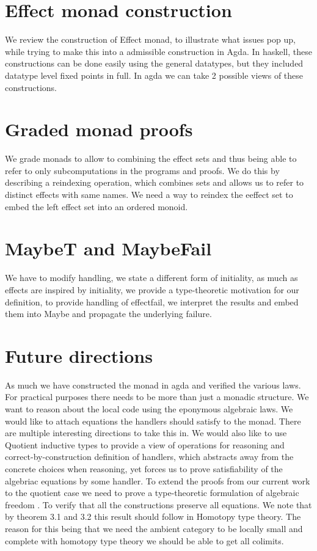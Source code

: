 \documentclass{article}
\begin{document}
\section{Effect monad construction}

We review the construction of Effect monad, to illustrate what issues pop up, while trying to make this into a admissible construction in Agda.
In haskell, these constructions can be done easily using the general datatypes, but they included datatype level fixed points in full.
In agda we can take 2 possible views of these constructions.

\section{Graded monad proofs}

We grade monads to allow to combining the effect sets and thus being able to refer to only subcomputations in the programs and proofs.
We do this by describing a reindexing operation, which combines sets and allows us to refer to distinct effects with same names.
We need a way to reindex the eeffect set to embed the left effect set into an ordered monoid.

\section{MaybeT and MaybeFail}
We have to modify handling, we state a different form of initiality, as much as effects are inspired by initiality, we provide a type-theoretic
motivation
for our definition, to provide handling of effectfail, we interpret the results and embed them into Maybe and propagate the underlying failure.
\section{Future directions}
As much we have constructed the monad in agda and verified the various laws. For practical purposes there needs to be more than just a monadic structure.
We want to reason about the local code using the eponymous algebraic laws. We would like to attach equations the handlers should satisfy to the monad.
There are multiple interesting directions to take this in. 
We would also like to use Quotient inductive types to provide a view of operations for reasoning and correct-by-construction definition of handlers,
which abstracts away from the concrete choices when reasoning, yet forces us to prove satisfiability of the algebriac equations by some handler.
To extend the proofs from our current work to the quotient case we need to prove a type-theoretic formulation of algebraic freedom \cite{ncatlab}.
To verify that all the constructions preserve all equations. We note that by theorem 3.1 and 3.2 \cite{ncatlab} this result should follow in Homotopy type theory.
The reason for this being that we need the ambient category to be locally small and complete with homotopy type theory we should be able to get all colimits.
\end{document}
